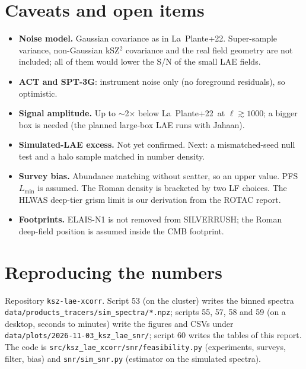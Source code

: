 \documentclass[11pt]{article}
\newcommand{\LP}{La~Plante+22}
\begin{document}
\section{Caveats and open items}
\begin{itemize}
\item \textbf{Noise model.} Gaussian covariance as in \LP. Super-sample variance, non-Gaussian kSZ$^2$ covariance and the real field geometry are not included; all of them would lower the S/N of the small LAE fields.
\item \textbf{ACT and SPT-3G}: instrument noise only (no foreground residuals), so optimistic.
\item \textbf{Signal amplitude.} Up to $\sim$2$\times$ below \LP\ at $\ell\gtrsim1000$; a bigger box is needed (the planned large-box LAE runs with Jahaan).
\item \textbf{Simulated-LAE excess.} Not yet confirmed. Next: a mismatched-seed null test and a halo sample matched in number density.
\item \textbf{Survey bias.} Abundance matching without scatter, so an upper value. PFS $L_{\min}$ is assumed. The Roman density is bracketed by two LF choices. The HLWAS deep-tier grism limit is our derivation from the ROTAC report.
\item \textbf{Footprints.} ELAIS-N1 is not removed from SILVERRUSH; the Roman deep-field position is assumed inside the CMB footprint.
\end{itemize}

\section*{Reproducing the numbers}\sloppy
Repository \texttt{ksz-lae-xcorr}. Script 53 (on the cluster) writes the binned spectra \texttt{data/products\_tracers/sim\_spectra/*.npz}; scripts 55, 57, 58 and 59 (on a desktop, seconds to minutes) write the figures and CSVs under \texttt{data/plots/2026-11-03\_ksz\_lae\_snr/}; script 60 writes the tables of this report. The code is \texttt{src/ksz\_lae\_xcorr/snr/feasibility.py} (experiments, surveys, filter, bias) and \texttt{snr/sim\_snr.py} (estimator on the simulated spectra).
\end{document}
